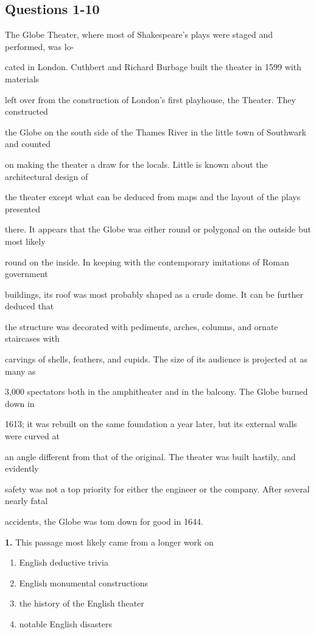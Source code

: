 \documentclass[12pt]{article}
\begin{document}
\subsection*{Questions 1-10}
\begingroup
\small
\sloppy
\setlength{\parskip}{0pt}
\setlength{\parindent}{0pt}
The Globe Theater, where most of Shakespeare's plays were staged and performed, was lo-\par
cated in London. Cuthbert and Richard Burbage built the theater in 1599 with materials\par
left over from the construction of London's first playhouse, the Theater. They constructed\par
the Globe on the south side of the Thames River in the little town of Southwark and counted\par
on making the theater a draw for the locals. Little is known about the architectural design of\par
the theater except what can be deduced from maps and the layout of the plays presented\par
there. It appears that the Globe was either round or polygonal on the outside but most likely\par
round on the inside. In keeping with the contemporary imitations of Roman government\par
buildings, its roof was most probably shaped as a crude dome. It can be further deduced that\par
the structure was decorated with pediments, arches, columns, and ornate staircases with\par
carvings of shells, feathers, and cupids. The size of its audience is projected at as many as\par
3,000 spectators both in the amphitheater and in the balcony. The Globe burned down in\par
1613; it was rebuilt on the same foundation a year later, but its external walls were curved at\par
an angle different from that of the original. The theater was built hastily, and evidently\par
safety was not a top priority for either the engineer or the company. After several nearly fatal\par
accidents, the Globe was tom down for good in 1644.\par
\endgroup
\medskip
\noindent\textbf{1.} This passage most likely came from a longer work on
\begin{enumerate}[label=(\Alph*),leftmargin=*,itemsep=0.2em]
\item English deductive trivia
\item English monumental constructions
\item the history of the English theater
\item notable English disasters
\end{enumerate}
\end{document}
